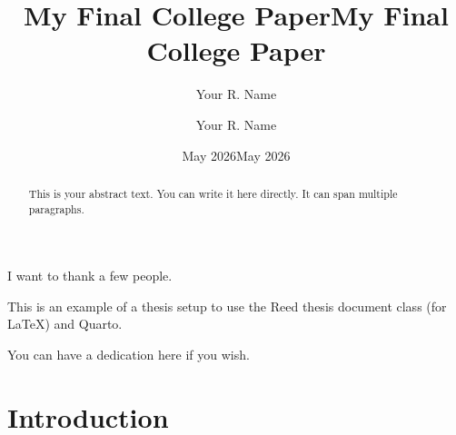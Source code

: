 \documentclass[
  letterpaper,
  12pt,
  twoside]{reedthesis}
\title{My Final College Paper}
\author{Your R. Name}
\date{May 2026}
\title{My Final College Paper}
\author{Your R. Name}
\date{May 2026}
\renewcommand*\contentsname{Table of contents}
\newcommand\contentsname{Table of contents}
\begin{document}
\maketitle


\frontmatter
\pagestyle{empty}



\begin{acknowledgements}
I want to thank a few people.
\end{acknowledgements}

\begin{preface}
This is an example of a thesis setup to use the Reed thesis document class (for LaTeX) and Quarto.
\end{preface}

\renewcommand{\contentsname}{Table of Contents}
\tableofcontents

\listoftables

\listoffigures

\begin{abstract}
This is your abstract text. You can write it here directly. It can span multiple paragraphs.
\end{abstract}

\begin{dedication}
You can have a dedication here if you wish.
\end{dedication}

\mainmatter
\pagestyle{fancyplain}


\chapter*{Introduction}\label{introduction}

\end{document}

